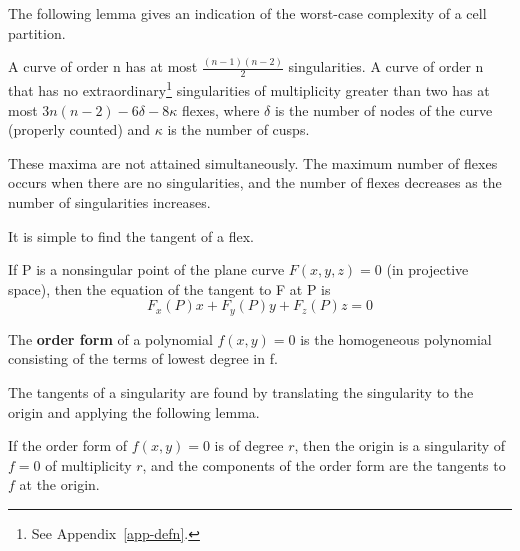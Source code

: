 The following lemma gives an indication of the worst-case complexity of a 
cell partition.
%
\begin{lemma}[{\cite[pp. 65,120]{wa}}]
\label{lem-maxsing}
A curve of order n has at most $\frac{(n-1)(n-2)}{2}$ singularities.
A curve of order n 
that has no extraordinary\footnote{See Appendix~\ref{app-defn}.}
singularities of multiplicity greater
than two has at most $3n(n-2)-6\delta-8\kappa$ flexes, where
$\delta$ is the number of nodes of the curve (properly counted)
and $\kappa$ is the number of cusps.
\end{lemma}
%
These maxima are not attained simultaneously.
The maximum number of flexes occurs when there are no singularities, and
the number of flexes decreases as the number of singularities increases.

It is simple to find the tangent of a flex.
%
\begin{lemma}[{\cite[p. 55]{wa}}]
\label{tangenteqn}
If P is a nonsingular point of the plane curve \mbox{$F(x,y,z)=0$}
(in projective space), then the equation of the tangent to F at P is
\[ F_{x}(P)x + F_{y}(P)y + F_{z}(P)z = 0 \]
\end{lemma}
%
\begin{definition}
The {\bf order form} of a polynomial $f(x,y)=0$ is the homogeneous
polynomial consisting of the terms of lowest degree in f.
\end{definition}

The tangents of a singularity are found by translating the singularity to the
origin and applying the following lemma.
%
\begin{lemma}[{\cite[p. 54]{wa}}]
If the order form of $f(x,y)=0$ is of degree $r$, 
then the origin is a singularity of $f=0$ of multiplicity $r$, 
and the components of the order form are the tangents to $f$ at the origin.
\end{lemma}
%

